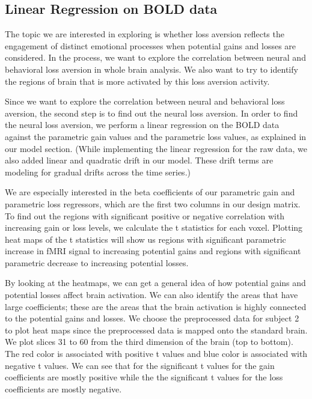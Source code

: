 \documentclass[11pt]{article}
\begin{document}
\subsection{Linear Regression on BOLD data}

The topic we are interested in exploring is whether loss aversion reflects 
the engagement of distinct emotional processes when potential gains and 
losses are considered. In the process, we want to explore the correlation 
between neural and behavioral loss aversion in whole brain analysis. We also 
want to try to identify the regions of brain that is more activated by this 
loss aversion activity.

Since we want to explore the correlation between neural and behavioral loss 
aversion, the second step is to find out the neural loss aversion. In order 
to find the neural loss aversion, we perform a linear regression on the BOLD 
data against the parametric gain values and the parametric loss values, as 
explained in our model section. (While implementing the linear regression for 
the raw data, we also added linear and quadratic drift in our model. These 
drift terms are modeling for gradual drifts across the time series.)

We are especially interested in the beta coefficients of our parametric gain 
and parametric loss regressors, which are the first two columns in our design 
matrix. To find out the regions with significant positive or negative 
correlation with increasing gain or loss levels, we calculate the t statistics 
for each voxel. Plotting heat maps of the t statistics will show us regions 
with significant parametric increase in fMRI signal to increasing potential 
gains and regions with significant parametric decrease to increasing potential 
losses.

By looking at the heatmaps, we can get a general idea of how potential gains 
and potential losses affect brain activation. We can also identify the areas 
that have large coefficients; these are the areas that the brain activation is 
highly connected to the potential gains and losses. We choose the preprocessed 
data for subject 2 to plot heat maps since the preprocessed data is mapped 
onto the standard brain. We plot slices 31 to 60 from the third dimension of 
the brain (top to bottom). The red color is associated with positive t values 
and blue color is associated with negative t values. We can see that for the 
significant t values for the gain coefficients are mostly positive while the
the significant t values for the loss coefficients are mostly negative.
\end{document}
